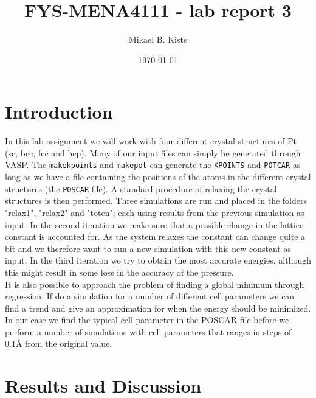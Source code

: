 \documentclass[a4paper,10pt]{article}
\date{\today}
\title{FYS-MENA4111 - lab report 3}
\author{Mikael B. Kiste}
\begin{document}
  \maketitle
  \tableofcontents
  \newpage
  \section{Introduction}
  	In this lab assignment we will work with four different crystal structures of Pt (sc, bcc, fcc and hcp). Many of our input files can simply be generated through VASP. The \texttt{makekpoints} and \texttt{makepot} can generate the \texttt{KPOINTS} and \texttt{POTCAR} as long as we have a file containing the positions of the atoms in the different crystal structures (the \texttt{POSCAR} file). A standard procedure of relaxing the crystal structures is then performed. Three simulations are run and placed in the folders "relax1", "relax2" and "toten"; each using results from the previous simulation as input. In the second iteration we make sure that a possible change in the lattice constant is accounted for. As the system relaxes the constant can change quite a bit and we therefore want to run a new simulation with this new constant as input. In the third iteration we try to obtain the most accurate energies, although this might result in some loss in the accuracy of the pressure.\\
  	It is also possible to approach the problem of finding a global minimum through regression. If do a simulation for a number of different cell parameters we can find a trend and give an approximation for when the energy should be minimized. In our case we find the typical cell parameter in the POSCAR file before we perform a number of simulations with cell parameters that ranges in steps of 0.1Å from the original value. 
  \section{Results and Discussion}
\end{document}
